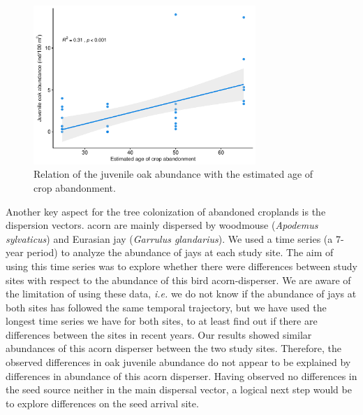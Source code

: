 \begin{figure}
    \centering
    \includegraphics[width=\textwidth,height=6cm,
  keepaspectratio]{img/coloniza/coloniza-ageCrop.pdf}
    \caption{Relation of the juvenile oak abundance with the estimated age of crop abandonment.}
    \label{fig:coloniza:ageCrop}
\end{figure}

Another key aspect for the tree colonization of abandoned croplands is the dispersion vectors. \Qp acorn are mainly dispersed by woodmouse (\emph{Apodemus sylvaticus}) and Eurasian jay (\emph{Garrulus glandarius})\autocites{Gomez2003ImpactVertebrate,Pereaetal2014InteraccionesPlantaanimal}. We used a time series (a 7-year period) to analyze the abundance of jays at each study site. The aim of using this time series was to explore whether there were differences between study sites with respect to the abundance of this bird acorn-disperser. We are aware of the limitation of using these data, \emph{i.e.} we do not know if the abundance of jays at both sites has followed the same temporal trajectory, but we have used the longest time series we have for both sites, to at least find out if there are differences between the sites in recent years. Our results showed similar abundances of this acorn disperser between the two study sites. Therefore, the observed differences in oak juvenile abundance do not appear to be explained by differences in abundance of this acorn disperser. Having observed no differences in the seed source neither in the main dispersal vector, a logical next step would be to explore differences on the seed arrival site. 


